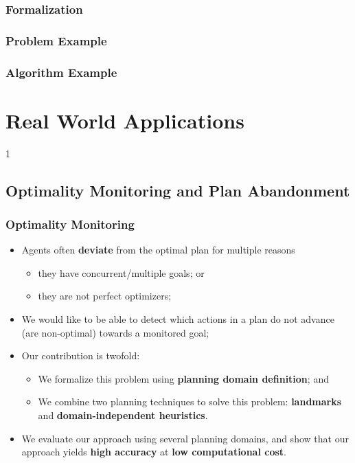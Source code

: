 \documentclass{beamer}
\def\masterclass{1}
\begin{document}
\begin{frame}[c]\frametitle{Formalization}
	
\end{frame}

\begin{frame}[c]\frametitle{Problem Example}
	
\end{frame}

\begin{frame}[c]\frametitle{Algorithm Example}
	
\end{frame}

\fi


\section{Real World Applications}

\if\masterclass1
\subsection{Optimality Monitoring and Plan Abandonment}
\begin{frame}[c]\frametitle{Optimality Monitoring}
   	\begin{itemize}
   		\item Agents often \textbf{deviate} from the optimal plan for multiple reasons
		\begin{itemize}
			\item they have concurrent/multiple goals; or 
			\item they are not perfect optimizers;
		\end{itemize}
		\item We would like to be able to detect which actions in a plan do not advance (are non-optimal) towards a monitored goal;
		\item Our contribution is twofold:
			\begin{itemize}
				\item We formalize this problem using \textbf{planning domain definition}; and
				\item We combine two planning techniques to solve this problem: \textbf{landmarks} and \textbf{domain-independent heuristics}.
			\end{itemize}
		\item We evaluate our approach using several planning domains, and show that our approach yields \textbf{high accuracy} at \textbf{low computational cost}.
	\end{itemize}
\end{frame}
\end{document}
